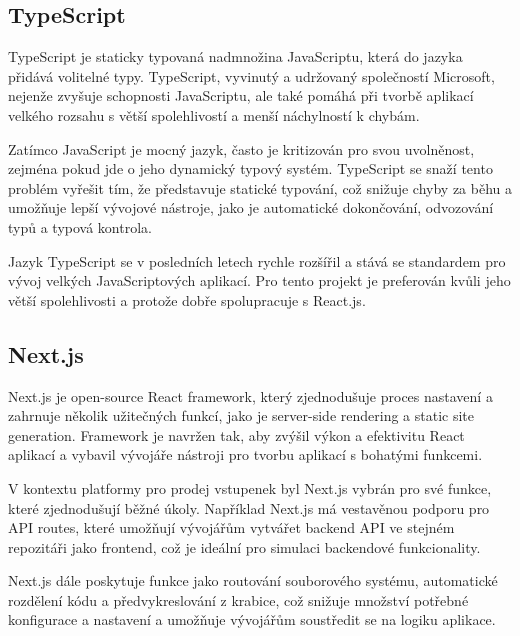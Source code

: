 \subsection{TypeScript}
\label{sec:implementace-techologie-typescript}
TypeScript je staticky typovaná nadmnožina JavaScriptu, která do jazyka přidává volitelné typy.
TypeScript, vyvinutý a udržovaný společností Microsoft, nejenže zvyšuje schopnosti JavaScriptu, ale také pomáhá při tvorbě aplikací velkého rozsahu s větší spolehlivostí a menší náchylností k chybám.

Zatímco JavaScript je mocný jazyk, často je kritizován pro svou uvolněnost, zejména pokud jde o jeho dynamický typový systém.
TypeScript se snaží tento problém vyřešit tím, že představuje statické typování, což snižuje chyby za běhu a umožňuje lepší vývojové nástroje, jako je automatické dokončování, odvozování typů a typová kontrola.

Jazyk TypeScript se v posledních letech rychle rozšířil a stává se standardem pro vývoj velkých JavaScriptových aplikací.
Pro tento projekt je preferován kvůli jeho větší spolehlivosti a protože dobře spolupracuje s React.js.

\subsection{Next.js}
\label{sec:implementace-techologie-nextjs}
Next.js je open-source React framework, který zjednodušuje proces nastavení a zahrnuje několik užitečných funkcí, jako je server-side rendering a static site generation.
Framework je navržen tak, aby zvýšil výkon a efektivitu React aplikací a vybavil vývojáře nástroji pro tvorbu aplikací s bohatými funkcemi.

V kontextu platformy pro prodej vstupenek byl Next.js vybrán pro své funkce, které zjednodušují běžné úkoly.
Například Next.js má vestavěnou podporu pro API routes, které umožňují vývojářům vytvářet backend API ve stejném repozitáři jako frontend, což je ideální pro simulaci backendové funkcionality.

Next.js dále poskytuje funkce jako routování souborového systému, automatické rozdělení kódu a předvykreslování z krabice, což snižuje množství potřebné konfigurace a nastavení a umožňuje vývojářům soustředit se na logiku aplikace.

